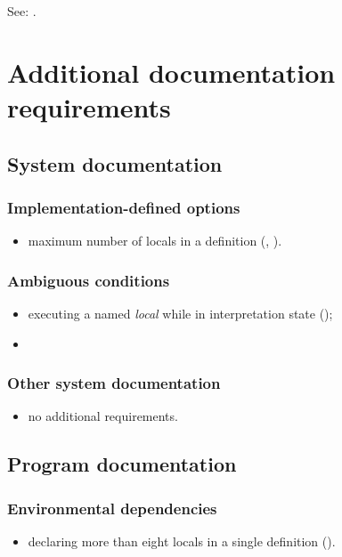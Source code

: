 See: .


\section{Additional documentation requirements} %

\subsection{System documentation} %

\subsubsection{Implementation-defined options} %
\begin{itemize}
\item maximum number of locals in a definition
	(,
	 ).
\end{itemize}

\subsubsection{Ambiguous conditions} %
\begin{itemize}
\item executing a named \emph{local} while in interpretation state
	();
\item {}
\end{itemize}

\subsubsection{Other system documentation} %
\begin{itemize}
\item no additional requirements.
\end{itemize}

\subsection{Program documentation} %

\subsubsection{Environmental dependencies} %
\begin{itemize}
\item declaring more than eight locals in a single definition
	().
\end{itemize}

